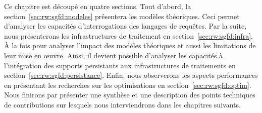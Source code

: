 Ce chapitre est découpé en quatre sections. Tout d'abord, la section~\ref{sec:rw:sgfd:modeles} présentera les modèles théoriques. Ceci permet d'analyser les capacités d'interrogations des langages de requêtes. Par la suite, nous présenterons les infrastructures de traitement en section~\ref{sec:rw:sgfd:infra}. À la fois pour analyser l'impact des modèles théoriques et aussi les limitations de leur mise en œuvre. Ainsi, il devient possible d'analyser les capacités à l'intégration des supports persistants aux infrastructures de traitements en section~\ref{sec:rw:sgfd:persistance}. Enfin, nous observerons les aspects performances en présentant les recherches sur les optimisations en section~\ref{sec:rw:sgfd:optim}. Nous finirons par présenter une synthèse et une description des points techniques de contributions sur lesquels nous interviendrons dans les chapitres suivants.






